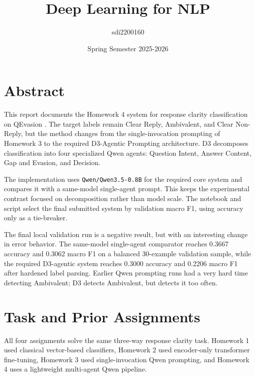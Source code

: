 \documentclass[12pt]{fphw}
\title{Deep Learning for NLP}
\author{sdi2200160}
\date{Spring Semester 2025-2026}
\institute{National and Kapodistrian University of Athens \\ Department of Informatics and Telecommunications}
\newcommand{\CR}{Clear Reply}
\newcommand{\AMB}{Ambivalent}
\newcommand{\CNR}{Clear Non-Reply}
\begin{document}
\maketitle

{
  \hypersetup{linkcolor=black}
  \tableofcontents
}
\newpage

\section{Abstract}

This report documents the Homework 4 system for response clarity classification on QEvasion \cite{qevasion}. The target labels remain \CR, \AMB, and \CNR, but the method changes from the single-invocation prompting of Homework 3 to the required D3-Agentic Prompting architecture. D3 decomposes classification into four specialized Qwen agents: Question Intent, Answer Content, Gap and Evasion, and Decision.

The implementation uses \texttt{Qwen/Qwen3.5-0.8B} \cite{qwen} for the required core system and compares it with a same-model single-agent prompt. This keeps the experimental contrast focused on decomposition rather than model scale. The notebook and script select the final submitted system by validation macro F1, using accuracy only as a tie-breaker.

The final local validation run is a negative result, but with an interesting change in error behavior. The same-model single-agent comparator reaches 0.3667 accuracy and 0.3062 macro F1 on a balanced 30-example validation sample, while the required D3-agentic system reaches 0.3000 accuracy and 0.2206 macro F1 after hardened label parsing. Earlier Qwen prompting runs had a very hard time detecting \AMB{}; D3 detects \AMB{}, but detects it too often.

\section{Task and Prior Assignments}

All four assignments solve the same three-way response clarity task. Homework 1 used classical vector-based classifiers, Homework 2 used encoder-only transformer fine-tuning, Homework 3 used single-invocation Qwen prompting, and Homework 4 uses a lightweight multi-agent Qwen pipeline.
\end{document}
